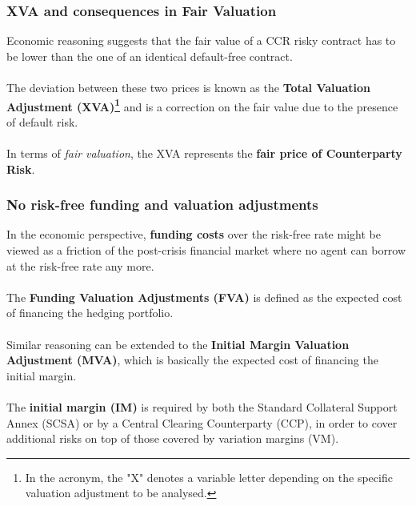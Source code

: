 \documentclass{beamer}
\begin{document}
\begin{frame}
\frametitle{XVA and consequences in Fair Valuation}
	Economic reasoning suggests that the fair value of a CCR risky contract has to be lower than the one of an identical default-free contract. \\~\\

	The deviation between these two prices is known as the \textbf{Total Valuation Adjustment (XVA)\footnote{In the acronym, the "X" denotes a variable letter depending on the specific valuation adjustment to be analysed.}} and is a correction on the fair value due to the presence of default risk.  \\~\\
	
	In terms of \textit{fair valuation}, the XVA represents the \textbf{fair price of Counterparty Risk}.

\end{frame}

\begin{frame}
\frametitle{No risk-free funding and valuation adjustments}

	In the economic perspective, \textbf{funding costs} over the risk-free rate might be viewed as a friction of the post-crisis financial market where no agent can borrow at the risk-free rate any more.\\~\\

 	The \textbf{Funding Valuation Adjustments (FVA)} is defined as the expected cost of financing the hedging portfolio. \\~\\

	Similar reasoning can be extended to the \textbf{Initial Margin Valuation Adjustment (MVA)}, which is basically the expected cost of financing the initial margin.  \\~\\
	
	The \textbf{initial margin (IM)} is required by both the Standard Collateral Support Annex (SCSA) or by a Central Clearing Counterparty (CCP), in order to cover additional risks on top of those covered by variation margins (VM).
\end{frame}
\end{document}
